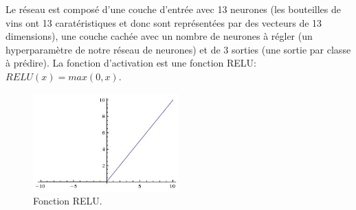 \documentclass[a4paper,11pt,oneside,roman]{article}
\begin{document}
    Le réseau est composé d'une couche d'entrée avec 13 neurones (les bouteilles de vins ont 13 caratéristiques et donc sont représentées par des vecteurs de 13 dimensions), une couche cachée avec un nombre de neurones à régler (un hyperparamètre de notre réseau de neurones) et de 3 sorties (une sortie par classe à prédire).
    La fonction d'activation est une fonction RELU: $RELU(x) = max(0,x)$. 
    
    \begin{figure}
        \centering
        \includegraphics[width=0.5\textwidth]{imgs/RELU.jpg}
        \caption{Fonction RELU.}
        \label{fig_relu}
    \end{figure}
    
\end{document}
